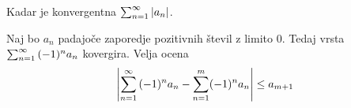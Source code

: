 
Kadar je konvergentna $\sum_{n=1}^{\infty} {|a_n|}$.


Naj bo $a_n$ padajoče zaporedje pozitivnih števil z limito $0$. Tedaj vrsta $\sum_{n=1}^{\infty} {(-1)^n a_n}$ kovergira. Velja ocena \[
	\left|\sum_{n=1}^{\infty} {(-1)^n a_n} - \sum_{n=1}^{m} (-1)^n a_n\right| \le a_{m+1}
\]